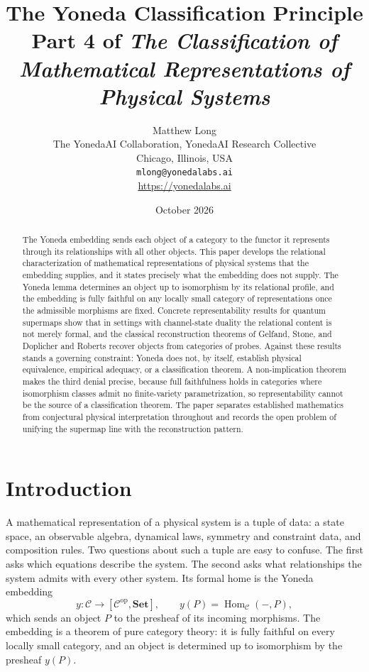 \documentclass[11pt,letterpaper]{article}
\title{The Yoneda Classification Principle\\[4pt]
  {\normalsize Part 4 of \emph{The Classification of Mathematical Representations of Physical Systems}}}
\author{Matthew Long\\
  \small The YonedaAI Collaboration, YonedaAI Research Collective\\
  \small Chicago, Illinois, USA\\
  \small \texttt{mlong@yonedalabs.ai}\\
  \small \url{https://yonedalabs.ai}}
\date{October 2026}
\DeclareMathOperator{\Hom}{Hom}
\theoremstyle{definition}
\theoremstyle{remark}
\begin{document}
\maketitle

\begin{abstract}
The Yoneda embedding sends each object of a category to the functor it represents through its relationships with all other objects. This paper develops the relational characterization of mathematical representations of physical systems that the embedding supplies, and it states precisely what the embedding does not supply. The Yoneda lemma determines an object up to isomorphism by its relational profile, and the embedding is fully faithful on any locally small category of representations once the admissible morphisms are fixed. Concrete representability results for quantum supermaps show that in settings with channel-state duality the relational content is not merely formal, and the classical reconstruction theorems of Gelfand, Stone, and Doplicher and Roberts recover objects from categories of probes. Against these results stands a governing constraint: Yoneda does not, by itself, establish physical equivalence, empirical adequacy, or a classification theorem. A non-implication theorem makes the third denial precise, because full faithfulness holds in categories where isomorphism classes admit no finite-variety parametrization, so representability cannot be the source of a classification theorem. The paper separates established mathematics from conjectural physical interpretation throughout and records the open problem of unifying the supermap line with the reconstruction pattern.
\end{abstract}

\section{Introduction}
\label{sec:intro}

A mathematical representation of a physical system is a tuple of data: a state space, an observable algebra, dynamical laws, symmetry and constraint data, and composition rules. Two questions about such a tuple are easy to confuse. The first asks which equations describe the system. The second asks what relationships the system admits with every other system. Its formal home is the Yoneda embedding
\[
y \colon \mathcal{C} \longrightarrow [\mathcal{C}^{\mathrm{op}}, \mathbf{Set}],
\qquad
y(P) = \Hom_{\mathcal{C}}(-, P),
\]
which sends an object $P$ to the presheaf of its incoming morphisms. The embedding is a theorem of pure category theory: it is fully faithful on every locally small category, and an object is determined up to isomorphism by the presheaf $y(P)$.
\end{document}
